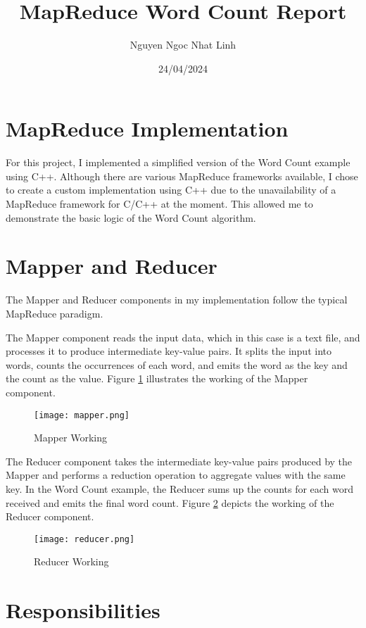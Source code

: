 \documentclass{article}
\title{MapReduce Word Count Report}
\author{Nguyen Ngoc Nhat Linh}
\date{24/04/2024}
\begin{document}
\maketitle

\section{MapReduce Implementation}

For this project, I implemented a simplified version of the Word Count example using C++. Although there are various MapReduce frameworks available, I chose to create a custom implementation using C++ due to the unavailability of a MapReduce framework for C/C++ at the moment. This allowed me to demonstrate the basic logic of the Word Count algorithm.

\section{Mapper and Reducer}

The Mapper and Reducer components in my implementation follow the typical MapReduce paradigm. 

The Mapper component reads the input data, which in this case is a text file, and processes it to produce intermediate key-value pairs. It splits the input into words, counts the occurrences of each word, and emits the word as the key and the count as the value. Figure \ref{fig:mapper} illustrates the working of the Mapper component.

\begin{figure}[h]
  \centering
  \texttt{[image: mapper.png]}
  \caption{Mapper Working}
  \label{fig:mapper}
\end{figure}

The Reducer component takes the intermediate key-value pairs produced by the Mapper and performs a reduction operation to aggregate values with the same key. In the Word Count example, the Reducer sums up the counts for each word received and emits the final word count. Figure \ref{fig:reducer} depicts the working of the Reducer component.

\begin{figure}[h]
  \centering
  \texttt{[image: reducer.png]}
  \caption{Reducer Working}
  \label{fig:reducer}
\end{figure}

\section{Responsibilities}
\end{document}
